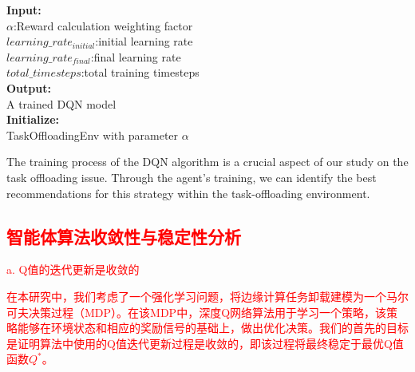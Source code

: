 \documentclass[preprint,12pt]{elsarticle}
\begin{document}
\begin{algorithm}[H]
    \caption{DQN Training for Task Offloading}
    \textbf{Input:}\\
        $\alpha$:Reward calculation weighting factor\\
        $learning\_rate_{initial}$:initial learning rate\\
        $learning\_rate_{final}$:final learning rate\\
        $total\_timesteps$:total training timesteps\\
    \textbf{Output:}
    \\A trained DQN model\\
    \textbf{Initialize:}
    \\TaskOffloadingEnv with parameter $\alpha$\\
\end{algorithm}

The training process of the DQN algorithm is a crucial aspect of our study on the task offloading issue. Through the agent's training, we can identify the best recommendations for this strategy within the task-offloading environment.

\subsection{\textcolor{red}{智能体算法收敛性与稳定性分析}}

\textcolor{red}{a.	Q值的迭代更新是收敛的}

\textcolor{red}{在本研究中，我们考虑了一个强化学习问题，将边缘计算任务卸载建模为一个马尔可夫决策过程（MDP）。在该MDP中，深度Q网络算法用于学习一个策略，该策略能够在环境状态和相应的奖励信号的基础上，做出优化决策。我们的首先的目标是证明算法中使用的Q值迭代更新过程是收敛的，即该过程将最终稳定于最优Q值函数\(Q^*\)。}
\end{document}

